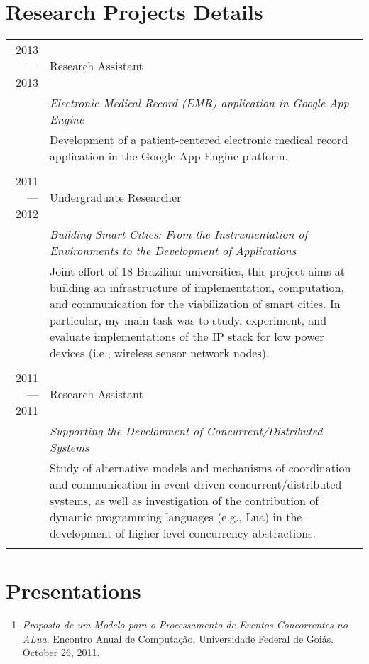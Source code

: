 \documentclass[a4paper,10pt]{article}
\begin{document}
\section{Research Projects Details}
\begin{tabular}{r|p{11cm}}
  \textsc{2013---2013}
  & Research Assistant \\
  &\emph{Electronic Medical Record (EMR) application in Google App Engine}\\
  &\footnotesize{Development of a patient-centered electronic medical record application in the Google App Engine platform.}
  \\\multicolumn{2}{c}{} \\ 
  \textsc{2011---2012}
  & Undergraduate Researcher \\
  &\emph{Building Smart Cities: From the Instrumentation of Environments to the Development of Applications}\\
  &\footnotesize{Joint effort of 18 Brazilian universities, this project aims at building an infrastructure of implementation, computation, and communication for the viabilization of smart cities. In particular, my main task was to study, experiment, and evaluate implementations of the IP stack for low power devices (i.e., wireless sensor network nodes).}
  \\\multicolumn{2}{c}{} \\
  \textsc{2011---2011}
  & Research Assistant \\
  &\emph{Supporting the Development of Concurrent/Distributed Systems}\\
  &\footnotesize{Study of alternative models and mechanisms of coordination and communication in event-driven concurrent/distributed systems, as well as investigation of the contribution of dynamic programming languages (e.g., Lua) in the development of higher-level concurrency abstractions.}
  \\\multicolumn{2}{c}{} \\
\end{tabular}

\pagebreak

\nocite{salazar:1}

\renewcommand\refname{Publications} 



\section{Presentations}
\begin{enumerate}
  \renewcommand{\labelenumi}{[P\arabic{enumi}] }
\item \emph{Proposta de um Modelo para o Processamento de Eventos Concorrentes no ALua}. Encontro Anual de Computação, Universidade Federal de Goiás. October 26, 2011.\\
\end{enumerate}
\end{document}
